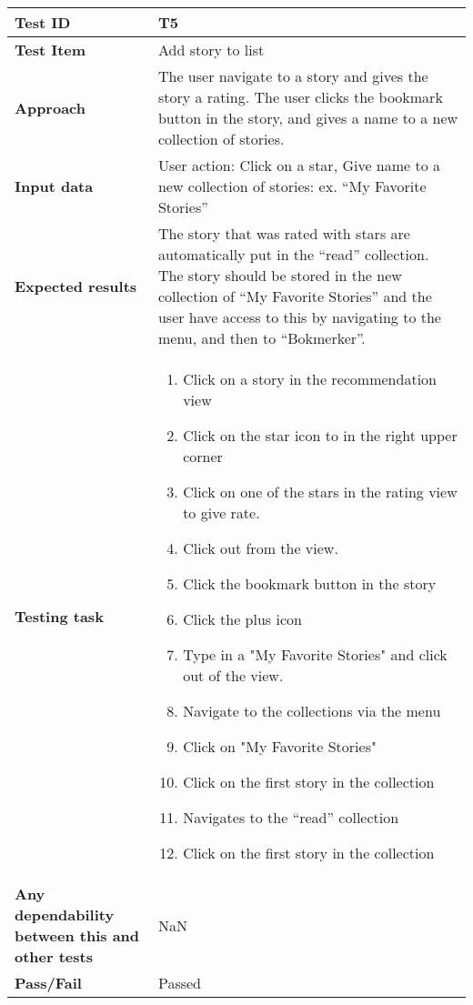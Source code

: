 \begin{center}
	\begin{table}[H]
		\begin{tabular}{ | p{4cm} | p{12cm}  |}
			\hline 
			\textbf{Test ID} & T5  \\ \hline
			\textbf{Test Item}  & Add story to list	 \\ \hline
			\textbf{Approach} & The user navigate to a story and gives the story a rating. The user clicks the bookmark button in the story, and gives a name to a new collection of stories.   \\ \hline
			\textbf{Input data} & User action: Click on a star, Give name to a new collection of stories: ex. “My Favorite Stories” \\ \hline
			\textbf{Expected results} & The story that was rated with stars are automatically put in the “read” collection. The story should be stored in the new collection of “My Favorite Stories” and the user have access to this by navigating to the menu, and then to “Bokmerker”. \\ \hline
			\textbf{Testing task} & 
			\begin{enumerate}[noitemsep]
			\item Click on a story in the recommendation view 
			\item Click on the star icon to in the right upper corner 
			\item Click on one of the stars in the rating view to give rate.
			\item Click out from the view. 
			\item Click the bookmark button in the story 
			\item Click the plus icon
			\item Type in a "My Favorite Stories" and click out of the view.
			\item Navigate to the collections via the menu
			\item Click on "My Favorite Stories"
			\item Click on the first story in the collection
			\item Navigates to the “read” collection
			\item Click on the first story in the collection
			\end{enumerate}
			\\ \hline
			\textbf{Any dependability between this and other tests} & NaN \\ \hline			
			\textbf{Pass/Fail} & Passed \\\hline		
		\end{tabular}
	\caption{}
	\label{Tab_systemTesting5}
	\end{table}
\end{center}	

